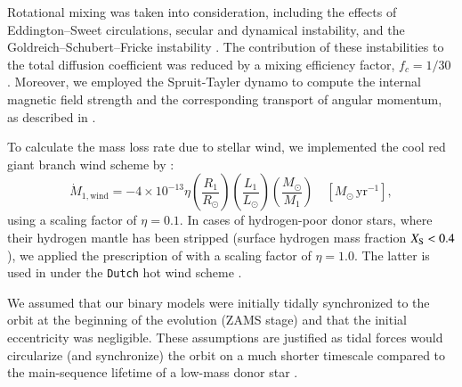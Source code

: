 \documentclass[main.tex]{subfiles}
\begin{document}
    Rotational mixing was taken into consideration, including the effects of Eddington–Sweet circulations, secular and dynamical instability, and the Goldreich–Schubert–Fricke instability \citep[see][for details]{Heger:apj2000}. The contribution of these instabilities to the total diffusion coefficient was reduced by a mixing efficiency factor, $f_c = 1/30$ \citep[][]{1992A&A...253..173C, Heger:apj2000}. Moreover, we employed the Spruit-Tayler dynamo to compute the internal magnetic field strength and the corresponding transport of angular momentum, as described in \cite[][]{Spruit:aap2002, Heger:apj2005}.
    
    To calculate the mass loss rate due to stellar wind, we implemented the cool red giant branch wind scheme by \cite{Reimers:bk1975}:
    \begin{equation}
        \label{eq:reimers_mdot}
        \dot{M}_{1, \text{wind}} = -4 \times 10^{-13} \eta \left(\frac{R_1}{R_\odot}\right) \left(\frac{L_1}{L_\odot}\right)\left(\frac{M_\odot}{M_1}\right)\quad [M_\odot\,\text{yr}^{-1}],
    \end{equation}
    using a scaling factor of $\eta = 0.1$. In cases of hydrogen-poor donor stars, where their hydrogen mantle has been stripped (surface hydrogen mass fraction $X_{\rm S} < 0.4$), we applied the prescription of \cite{Nugis:aap2000} with a scaling factor of $\eta = 1.0$. The latter is used in \mesa under the \texttt{Dutch} hot wind scheme \citep[][]{Glebbeek:aap2009}.
    
    We assumed that our binary models were initially tidally synchronized to the orbit at the beginning of the evolution (ZAMS stage) and that the initial eccentricity was negligible. These assumptions are justified as tidal forces would circularize (and synchronize) the orbit on a much shorter timescale compared to the main-sequence lifetime of a low-mass donor star \citep[e.g.,][]{Verbunt:aa1995}.
    
\end{document}
